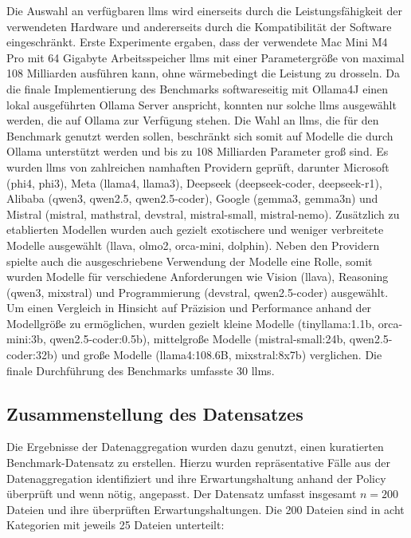 Die Auswahl an verfügbaren \glspl{llm} wird einerseits durch die Leistungsfähigkeit der verwendeten Hardware und andererseits durch die Kompatibilität der Software eingeschränkt.
Erste Experimente ergaben, dass der verwendete Mac Mini M4 Pro mit 64 Gigabyte Arbeitsspeicher \glspl{llm} mit einer Parametergröße von maximal 108 Milliarden ausführen kann, ohne wärmebedingt die Leistung zu drosseln.
Da die finale Implementierung des Benchmarks softwareseitig mit Ollama4J einen lokal ausgeführten Ollama Server anspricht, konnten nur solche \glspl{llm} ausgewählt werden, die auf Ollama zur Verfügung stehen.
Die Wahl an \glspl{llm}, die für den Benchmark genutzt werden sollen, beschränkt sich somit auf Modelle die durch Ollama unterstützt werden und bis zu 108 Milliarden Parameter groß sind.
Es wurden \glspl{llm} von zahlreichen namhaften Providern geprüft, darunter Microsoft (phi4, phi3), Meta (llama4, llama3), Deepseek (deepseek-coder, deepseek-r1), Alibaba (qwen3, qwen2.5, qwen2.5-coder), Google (gemma3, gemma3n) und Mistral (mistral, mathstral, devstral, mistral-small, mistral-nemo).
Zusätzlich zu etablierten Modellen wurden auch gezielt exotischere und weniger verbreitete Modelle ausgewählt (llava, olmo2, orca-mini, dolphin).
Neben den Providern spielte auch die ausgeschriebene Verwendung der Modelle eine Rolle, somit wurden Modelle für verschiedene Anforderungen wie Vision (llava), Reasoning (qwen3, mixstral) und Programmierung (devstral, qwen2.5-coder) ausgewählt.
Um einen Vergleich in Hinsicht auf Präzision und Performance anhand der Modellgröße zu ermöglichen, wurden gezielt kleine Modelle (tinyllama:1.1b, orca-mini:3b, qwen2.5-coder:0.5b), mittelgroße Modelle (mistral-small:24b, qwen2.5-coder:32b) und große Modelle (llama4:108.6B, mixstral:8x7b) verglichen.
Die finale Durchführung des Benchmarks umfasste 30 \glspl{llm}.


\subsection{Zusammenstellung des Datensatzes}\label{sec:datensatz-benchmark}

Die Ergebnisse der Datenaggregation wurden dazu genutzt, einen kuratierten Benchmark-Datensatz zu erstellen.
Hierzu wurden repräsentative Fälle aus der Datenaggregation identifiziert und ihre Erwartungshaltung anhand der Policy überprüft und wenn nötig, angepasst.
Der Datensatz umfasst insgesamt $n=200$ Dateien und ihre überprüften Erwartungshaltungen.
Die \num{200} Dateien sind in acht Kategorien mit jeweils \num{25} Dateien unterteilt:

